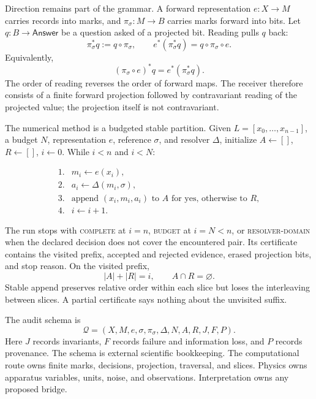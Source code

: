 Direction remains part of the grammar.  A forward representation \(e:X\to M\) carries records into marks, and
\(\pi_\sigma:M\to B\) carries marks forward into bits.  Let \(q:B\to\mathsf{Answer}\) be a question asked of a
projected bit.  Reading pulls \(q\) back:
\[
 \pi_\sigma^*q:=q\circ\pi_\sigma,\qquad
 e^*(\pi_\sigma^*q)=q\circ\pi_\sigma\circ e.
\]
Equivalently,
\[
             (\pi_\sigma\circ e)^*q=e^*(\pi_\sigma^*q).
\]
The order of reading reverses the order of forward maps.  The receiver therefore consists of a finite forward
projection followed by contravariant reading of the projected value; the projection itself is not contravariant.

The numerical method is a budgeted stable partition.  Given
\(L=[x_0,\ldots,x_{n-1}]\), a budget \(N\), representation \(e\), reference \(\sigma\), and resolver \(\Delta\),
initialize \(A\leftarrow[]\), \(R\leftarrow[]\), \(i\leftarrow0\).  While \(i<n\) and \(i<N\):

\[
\begin{array}{ll}
1.&m_i\leftarrow e(x_i),\\
2.&a_i\leftarrow\Delta(m_i,\sigma),\\
3.&\text{append }(x_i,m_i,a_i)\text{ to }A\text{ for yes, otherwise to }R,\\
4.&i\leftarrow i+1.
\end{array}
\]

The run stops with \textsc{complete} at \(i=n\), \textsc{budget} at \(i=N<n\), or
\textsc{resolver-domain} when the declared decision does not cover the encountered pair.  Its certificate contains the
visited prefix, accepted and rejected evidence, erased projection bits, and stop reason.  On the visited prefix,
\[
             |A|+|R|=i,\qquad A\cap R=\varnothing.
\]
Stable append preserves relative order within each slice but loses the interleaving between slices.  A partial
certificate says nothing about the unvisited suffix.

The audit schema is
\[
 \mathcal Q=(X,M,e,\sigma,\pi_\sigma,\Delta,N,A,R,J,F,P).
\]
Here \(J\) records invariants, \(F\) records failure and information loss, and \(P\) records provenance.  The schema is
external scientific bookkeeping.  The computational route owns finite marks, decisions, projection, traversal, and
slices.  Physics owns apparatus variables, units, noise, and observations.  Interpretation owns any proposed bridge.

